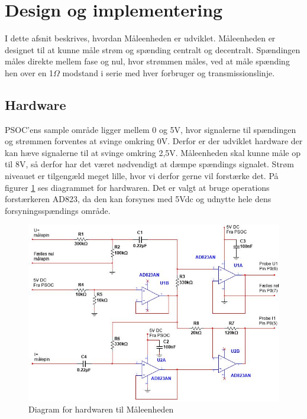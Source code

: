 
\section{Design og implementering}
I dette afsnit beskrives, hvordan Måleenheden er udviklet. Måleenheden er designet til at kunne måle strøm og spænding centralt og decentralt. Spændingen måles direkte mellem fase og nul, hvor strømmen måles, ved at måle spænding hen over en 1$\Omega$ modstand i serie med hver forbruger og transmissionslinje. 

\subsection{Hardware}
PSOC'ens sample område ligger mellem 0 og 5V, hvor signalerne til spændingen og strømmen forventes at svinge omkring 0V. Derfor er der udviklet hardware der kan hæve signalerne til at svinge omkring 2,5V. Måleenheden skal kunne måle op til 8V, så derfor har det været nødvendigt at dæmpe spændings signalet. Strøm niveauet er tilgengæld meget lille, hvor vi derfor gerne vil forstærke det. På figurer \ref{fig:MaalHardware} ses diagrammet for hardwaren. Det er valgt at bruge operations forstærkeren AD823, da den kan forsynes med 5Vdc og udnytte hele dens forsyningsspændings område.  

\begin{figure}[htbp] %
	\centering
	\includegraphics[width=1\textwidth]{figure/MaalHardware}
	\caption{Diagram for hardwaren til Måleenheden}
	\label{fig:MaalHardware}
\end{figure} 

